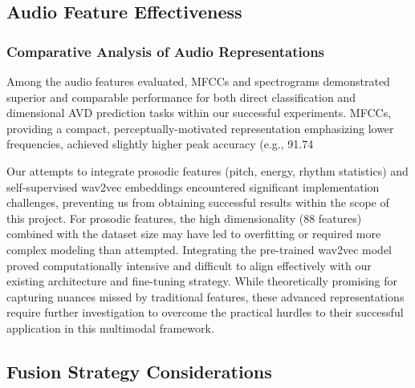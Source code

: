 \documentclass[12pt]{article}
\begin{document}
\subsection{Audio Feature Effectiveness}
\subsubsection{Comparative Analysis of Audio Representations}
Among the audio features evaluated, MFCCs and spectrograms demonstrated superior and comparable performance for both direct classification and dimensional AVD prediction tasks within our successful experiments. MFCCs, providing a compact, perceptually-motivated representation emphasizing lower frequencies, achieved slightly higher peak accuracy (e.g., 91.74%

Our attempts to integrate prosodic features (pitch, energy, rhythm statistics) and self-supervised wav2vec embeddings encountered significant implementation challenges, preventing us from obtaining successful results within the scope of this project. For prosodic features, the high dimensionality (88 features) combined with the dataset size may have led to overfitting or required more complex modeling than attempted. Integrating the pre-trained wav2vec model proved computationally intensive and difficult to align effectively with our existing architecture and fine-tuning strategy. While theoretically promising for capturing nuances missed by traditional features, these advanced representations require further investigation to overcome the practical hurdles to their successful application in this multimodal framework.

\subsection{Fusion Strategy Considerations}
\end{document}
